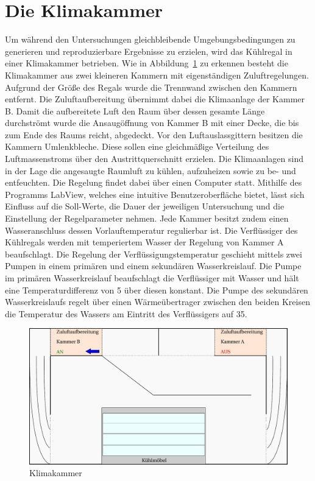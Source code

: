 \section{Die Klimakammer}
\label{sec:Die Klimakammer}

Um während den Untersuchungen gleichbleibende Umgebungsbedingungen zu generieren und  reproduzierbare Ergebnisse zu erzielen, wird das Kühlregal in einer Klimakammer betrieben.
Wie in Abbildung~\ref{fig:Klimakammer} zu erkennen besteht die Klimakammer aus zwei kleineren Kammern mit eigenständigen Zuluftregelungen. Aufgrund der Größe des Regals wurde die Trennwand zwischen den Kammern entfernt. Die Zuluftaufbereitung übernimmt dabei die Klimaanlage der Kammer B. Damit die aufbereitete Luft den Raum über dessen gesamte Länge durchströmt wurde die Ansaugöffnung von Kammer B mit einer Decke, die bis zum Ende des Raums reicht, abgedeckt. Vor den Luftauslassgittern besitzen die Kammern Umlenkbleche. Diese sollen eine gleichmäßige Verteilung des Luftmassenstroms über den Austrittquerschnitt erzielen. Die Klimaanlagen sind in der Lage die angesaugte Raumluft zu kühlen, aufzuheizen sowie zu be- und entfeuchten. Die Regelung findet dabei über einen Computer statt. Mithilfe des Programms LabView, welches eine intuitive Benutzeroberfläche bietet, lässt sich Einfluss auf die Soll-Werte, die Dauer der jeweiligen Untersuchung und die Einstellung der Regelparameter nehmen. 
Jede Kammer besitzt zudem einen Wasseranschluss dessen Vorlauftemperatur regulierbar ist.
Die Verflüssiger des Kühlregals werden mit temperiertem Wasser der Regelung von Kammer A beaufschlagt. Die Regelung der Verflüssigungstemperatur geschieht mittels zwei Pumpen in einem primären und einem sekundären Wasserkreislauf. Die Pumpe im primären Wasserkreislauf beaufschlagt die Verflüssiger mit Wasser und hält eine Temperaturdifferenz von \unit{5}{\kelvin} über diesen konstant. Die Pumpe des sekundären Wasserkreislaufs regelt über einen Wärmeübertrager zwischen den beiden Kreisen die Temperatur des Wassers am Eintritt des Verflüssigers auf \unit{35}{\celsius}.


\begin{figure}[htb]
\centering
\includegraphics[scale=.6]{Pictures/ClimateChamber.pdf}
\caption{Klimakammer}
\label{fig:Klimakammer}
\end{figure}

